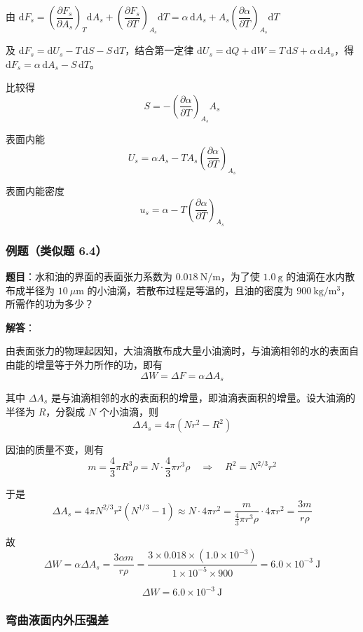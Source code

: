 \documentclass[UTF8]{ctexart}
\begin{document}
由 $\mathrm{d}F_s=\left(\dfrac{\partial F_s}{\partial A_s}\right)_T\mathrm{d}A_s+\left(\dfrac{\partial F_s}{\partial T}\right)_{A_s}\mathrm{d}T=\alpha\,\mathrm{d}A_s+A_s\left(\dfrac{\partial\alpha}{\partial T}\right)_{A_s}\mathrm{d}T$

及 $\mathrm{d}F_s=\mathrm{d}U_s-T\,\mathrm{d}S-S\,\mathrm{d}T$，结合第一定律 $\mathrm{d}U_s=\mathrm{d}Q+\mathrm{d}W=T\,\mathrm{d}S+\alpha\,\mathrm{d}A_s$，得 $\mathrm{d}F_s=\alpha\,\mathrm{d}A_s-S\,\mathrm{d}T$。

比较得
\[
S=-\left(\frac{\partial\alpha}{\partial T}\right)_{A_s}A_s
\]

表面内能
\[
U_s=\alpha A_s-TA_s\left(\frac{\partial\alpha}{\partial T}\right)_{A_s}
\]

表面内能密度
\[
\boxed{u_s=\alpha-T\left(\frac{\partial\alpha}{\partial T}\right)_{A_s}}
\]

\subsubsection{例题（类似题 6.4）}

\textbf{题目}：水和油的界面的表面张力系数为 $0.018\ \mathrm{N/m}$，为了使 $1.0\ \mathrm{g}$ 的油滴在水内散布成半径为 $10\ \mu\mathrm{m}$ 的小油滴，若散布过程是等温的，且油的密度为 $900\ \mathrm{kg/m^3}$，所需作的功为多少？

\textbf{解答}：

由表面张力的物理起因知，大油滴散布成大量小油滴时，与油滴相邻的水的表面自由能的增量等于外力所作的功，即有
\[
\Delta W=\Delta F=\alpha\Delta A_s
\]

其中 $\Delta A_s$ 是与油滴相邻的水的表面积的增量，即油滴表面积的增量。设大油滴的半径为 $R$，分裂成 $N$ 个小油滴，则
\[
\Delta A_s=4\pi(Nr^2-R^2)
\]

因油的质量不变，则有
\[
m=\frac{4}{3}\pi R^3\rho=N\cdot\frac{4}{3}\pi r^3\rho
\quad\Longrightarrow\quad
R^2=N^{2/3}r^2
\]

于是
\[
\Delta A_s=4\pi N^{2/3}r^2(N^{1/3}-1)\approx N\cdot 4\pi r^2
=\frac{m}{\frac{4}{3}\pi r^3\rho}\cdot 4\pi r^2
=\frac{3m}{r\rho}
\]

故
\[
\Delta W=\alpha\Delta A_s=\frac{3\alpha m}{r\rho}
=\frac{3\times 0.018\times(1.0\times 10^{-3})}{1\times 10^{-5}\times 900}
=6.0\times 10^{-3}\ \mathrm{J}
\]

\[
\boxed{\Delta W=6.0\times 10^{-3}\ \mathrm{J}}
\]

\subsubsection{弯曲液面内外压强差}
\end{document}
